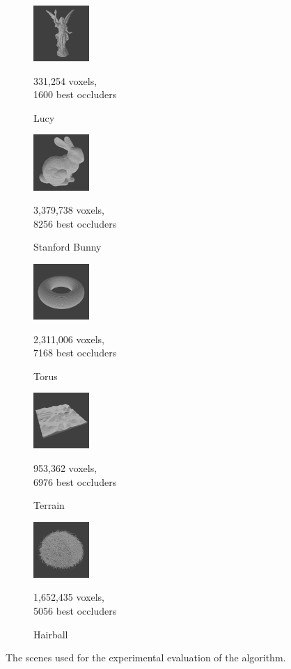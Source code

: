 \begin{figure}[!htb]
  \begin{subfigure}{80px}
      \includegraphics[width=80px]{images/graphics/model-lucy.jpg}
      \caption{Lucy}
      \parbox{\linewidth}{\centering\footnotesize 331,254 voxels,\\ 1600 best occluders}
  \end{subfigure}
  \begin{subfigure}{80px}
      \includegraphics[width=80px]{images/graphics/model-bunny.jpg}
      \caption{Stanford Bunny}
      \parbox{\linewidth}{\centering\footnotesize 3,379,738 voxels,\\ 8256 best occluders}
  \end{subfigure}
  \begin{subfigure}{80px}
      \includegraphics[width=80px]{images/graphics/model-torus.jpg}
      \caption{Torus}
      \parbox{\linewidth}{\centering\footnotesize 2,311,006 voxels,\\ 7168 best occluders}
  \end{subfigure}
  \begin{subfigure}{80px}
      \includegraphics[width=80px]{images/graphics/model-terrain.jpg}
      \caption{Terrain}
      \parbox{\linewidth}{\centering\footnotesize 953,362 voxels,\\ 6976 best occluders}
  \end{subfigure}
  \begin{subfigure}{80px}
      \includegraphics[width=80px]{images/graphics/model-hairball.jpg}
      \caption{Hairball}
      \parbox{\linewidth}{\centering\footnotesize 1,652,435 voxels,\\ 5056 best occluders}
  \end{subfigure}
  
  \caption{The scenes used for the experimental evaluation of the algorithm.}
  \label{fig:experiment-models}
\end{figure}



